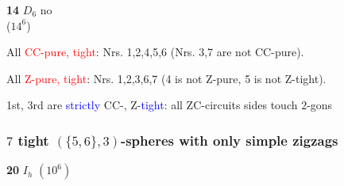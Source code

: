 \documentclass{beamer}
\begin{document}
\begin{frame}
\begin{center}
\begin{minipage}[b]{25mm}
{\bf 14} $D_{6}$  no\\($14^6$)
\end{minipage}\end{center}  
All \textcolor{red}{CC-pure, tight}: Nrs. 1,2,4,5,6 (Nrs. 3,7 are not 
CC-pure).

 All
\textcolor{red}{Z-pure, tight}: Nrs. 1,2,3,6,7 (4 is not Z-pure, 5 is 
not 
Z-tight).

1st, 3rd are \textcolor{blue}{strictly} CC-, Z-\textcolor{blue}{tight}: 
all ZC-circuits sides touch
$2$-gons
\end{frame}



\begin{frame}\frametitle{$7$ tight $(\{5,6\},3)$-spheres with only simple
zigzags}
\vspace{-3mm}
\begin{center}
\begin{minipage}{2.2cm}
\centering
{}\par
{\bf 20}  $I_h$ $(10^6)$
\end{minipage}
\begin{minipage}{2.3cm}

\end{minipage}
\end{center}
\end{frame}
\end{document}
